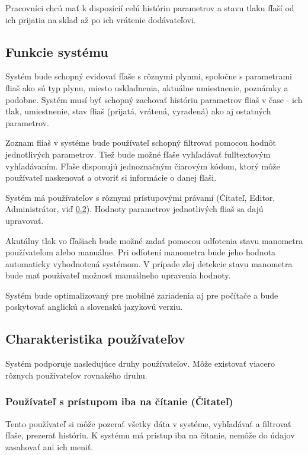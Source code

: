 \documentclass{zah}
\begin{document}
Pracovníci chcú mať k dispozícií celú históriu parametrov a stavu tlaku fľaší od ich prijatia na sklad až po ich vrátenie dodávateľovi.

\subsection{Funkcie systému}
\label{gen:functions}
Systém bude schopný evidovať fľaše s rôznymi plynmi, spoločne s parametrami fliaš ako sú typ plynu, miesto uskladnenia, aktuálne umiestnenie, poznámky a podobne. Systém musí byť schopný zachovať históriu parametrov fliaš v čase - ich tlak, umiestnenie, stav fliaš (prijatá, vrátená, vyradená) ako aj ostatných parametrov.

Zoznam fliaš v systéme bude používateľ schopný filtrovať pomocou hodnôt jednotlivých parametrov. Tiež bude možné fľaše vyhľadávať fulltextovým vyhľadávaním. Fľaše disponujú jednoznačným čiarovým kódom, ktorý môže používateľ naskenovať a otvoriť si informácie o danej fľaši.

Systém má používateľov s rôznymi prístupovými právami (Čitateľ, Editor, Administrátor, viď \ref{gen:users}). Hodnoty parametrov jednotlivých fliaš sa dajú upravovať.

Akutálny tlak vo fľašiach bude možné zadať pomocou odfotenia stavu manometra používateľom alebo manuálne. Pri odfotení manometra bude jeho hodnota automaticky vyhodnotená systémom. V prípade zlej detekcie stavu manometra bude mať používateľ možnosť manuálneho upravenia hodnoty.

Systém bude optimalizovaný pre mobilné zariadenia aj pre počítače a bude poskytovať anglickú a slovenskú jazykovú verziu.

\subsection{Charakteristika používateľov}
\label{gen:users}

Systém podporuje nasledujúce druhy používateľov. Môže existovať viacero rôznych používateľov rovnakého druhu.

\subsubsection{Používateľ s prístupom iba na čítanie (Čitateľ)}
\label{gen:users:ro}

Tento používateľ si môže pozerať všetky dáta v systéme, vyhľadávať a filtrovať fľaše, prezerať históriu. K systému má prístup iba na čítanie, nemôže do údajov zasahovať ani ich meniť.
\end{document}
